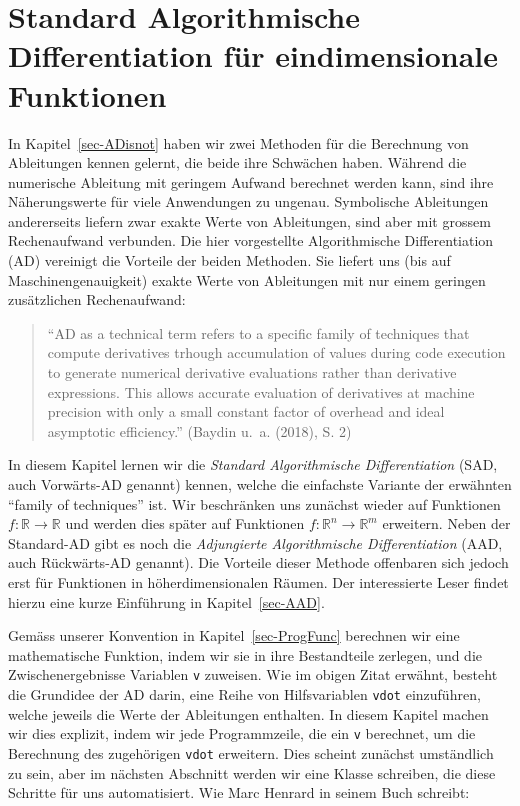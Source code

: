 \documentclass[
  a4paper,
  DIV=11]{scrreprt}
\theoremstyle{definition}
\theoremstyle{definition}
\theoremstyle{remark}
\begin{document}

\hypertarget{sec-SADforOneDimFunctions}{%
\chapter{Standard Algorithmische Differentiation für eindimensionale
Funktionen}\label{sec-SADforOneDimFunctions}}

In Kapitel~\ref{sec-ADisnot} haben wir zwei Methoden für die Berechnung
von Ableitungen kennen gelernt, die beide ihre Schwächen haben. Während
die numerische Ableitung mit geringem Aufwand berechnet werden kann,
sind ihre Näherungswerte für viele Anwendungen zu ungenau. Symbolische
Ableitungen andererseits liefern zwar exakte Werte von Ableitungen, sind
aber mit grossem Rechenaufwand verbunden. Die hier vorgestellte
Algorithmische Differentiation (AD) vereinigt die Vorteile der beiden
Methoden. Sie liefert uns (bis auf Maschinengenauigkeit) exakte Werte
von Ableitungen mit nur einem geringen zusätzlichen Rechenaufwand:

\begin{quote}
``AD as a technical term refers to a specific family of techniques that
compute derivatives trhough accumulation of values during code execution
to generate numerical derivative evaluations rather than derivative
expressions. This allows accurate evaluation of derivatives at machine
precision with only a small constant factor of overhead and ideal
asymptotic efficiency.'' (Baydin u.~a. (2018), S. 2)
\end{quote}

In diesem Kapitel lernen wir die \emph{Standard Algorithmische
Differentiation} (SAD, auch Vorwärts-AD genannt) kennen, welche die
einfachste Variante der erwähnten ``family of techniques'' ist. Wir
beschränken uns zunächst wieder auf Funktionen
\(f : \mathbb{R} \rightarrow \mathbb{R}\) und werden dies später auf
Funktionen \(f : \mathbb{R}^n \rightarrow \mathbb{R}^m\) erweitern.
Neben der Standard-AD gibt es noch die \emph{Adjungierte Algorithmische
Differentiation} (AAD, auch Rückwärts-AD genannt). Die Vorteile dieser
Methode offenbaren sich jedoch erst für Funktionen in höherdimensionalen
Räumen. Der interessierte Leser findet hierzu eine kurze Einführung in
Kapitel~\ref{sec-AAD}.

Gemäss unserer Konvention in Kapitel~\ref{sec-ProgFunc} berechnen wir
eine mathematische Funktion, indem wir sie in ihre Bestandteile
zerlegen, und die Zwischenergebnisse Variablen \texttt{v} zuweisen. Wie
im obigen Zitat erwähnt, besteht die Grundidee der AD darin, eine Reihe
von Hilfsvariablen \texttt{vdot} einzuführen, welche jeweils die Werte
der Ableitungen enthalten. In diesem Kapitel machen wir dies explizit,
indem wir jede Programmzeile, die ein \texttt{v} berechnet, um die
Berechnung des zugehörigen \texttt{vdot} erweitern. Dies scheint
zunächst umständlich zu sein, aber im nächsten Abschnitt werden wir eine
Klasse schreiben, die diese Schritte für uns automatisiert. Wie Marc
Henrard in seinem Buch schreibt:
\end{document}
